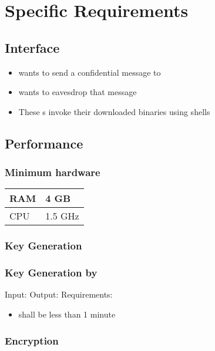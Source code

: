 \section{Specific Requirements}


\subsection{Interface}

\begin{frame}
\begin{itemize}
\item \alice{} wants to send a confidential message to \bob
\item \eve{} wants to eavesdrop that message
\item These \eu s invoke their downloaded \cry{} binaries
  using \cl{} shells
\end{itemize}
\end{frame}


\subsection{Performance}

\begin{frame}
\frametitle{Minimum hardware}
\begin{tabular}{l|l}
RAM & 4 GB \\ \hline
CPU & 1.5 GHz
\end{tabular}
\end{frame}

\subsubsection{Key Generation}

\begin{frame}
\frametitle{Key Generation by \bob}
Input: \generatekeysin \medskip
Output: \generatekeysout \medskip
Requirements:
\begin{itemize}
\item \generatekeystime{}
  shall be less than 1 minute
\end{itemize}
\end{frame}

\subsubsection{Encryption}

